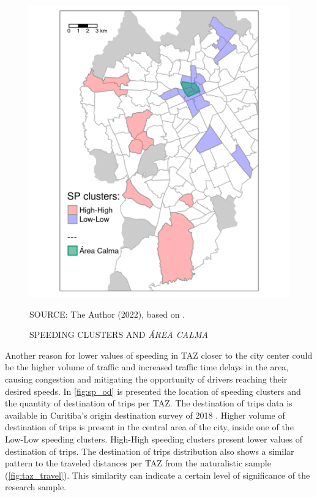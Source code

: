 \begin{figure}[!htbp]
    \footnotesize
    \captionsetup{font=footnotesize}
    \caption{SPEEDING CLUSTERS AND \textit{ÁREA CALMA}}
    \centering
    \includegraphics{fig/area_calma_plot.png}
    \label{fig:sp_area_calma}
    \par SOURCE: The Author (2022), based on \textcite{IPPUC2021}.
\end{figure}

Another reason for lower values of speeding in TAZ closer to the city center could be the higher volume of traffic and increased traffic time delays in the area, causing congestion and mitigating the opportunity of drivers reaching their desired speeds. In \autoref{fig:sp_od} is presented the location of speeding clusters and the quantity of destination of trips per TAZ. The destination of trips data is available in Curitiba's origin destination survey of 2018 \cite{IPPUC2018b}. Higher volume of destination of trips is present in the central area of the city, inside one of the Low-Low speeding clusters. High-High speeding clusters present lower values of destination of trips. The destination of trips distribution also shows a similar pattern to the traveled distances per TAZ from the naturalistic sample (\autoref{fig:taz_travel}). This similarity can indicate a certain level of significance of the research sample. 

